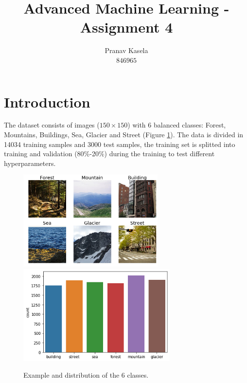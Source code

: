 \documentclass[12pt,a4paper]{article}
\title{Advanced Machine Learning - Assignment 4}
\author{Pranav Kasela \\$846965$}
\date{}
\begin{document}
\maketitle

\section*{Introduction}
The dataset consists of images ($150\times150$) with 6 balanced classes: Forest, Mountains, Buildings, Sea, Glacier and Street (Figure \ref{fig:example}). The data is divided in 14034 training samples and 3000 test samples, the training set is splitted into training and validation (80\%-20\%) during the training to test different hyperparameters. 
\begin{figure}[!h]
  \centering
  \includegraphics[width=\linewidth, height=5cm]{imgs/samples.png}
  \includegraphics[width=\linewidth, height=5cm]{imgs/class.png}
  \caption{Example and distribution of the 6 classes.}
  \label{fig:example}
\end{figure}
\end{document}
